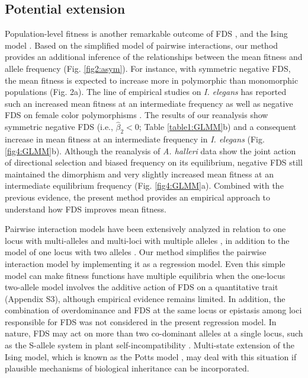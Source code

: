 \documentclass[12pt,]{article}
\begin{document}
\subsection{Potential extension}
Population-level fitness is another remarkable outcome of FDS \citep{cockerham1972frequency,asmussen_frequency-dependent_1990,schneider_maximization_2008,takahashi2018balanced}, and the Ising model \citep{cipra1987introduction,sato2019neighbor}. Based on the simplified model of pairwise interactions, our method provides an additional inference of the relationships between the mean fitness and allele frequency (Fig. \ref{fig2:asym}). For instance, with symmetric negative FDS, the mean fitness is expected to increase more in polymorphic than monomorphic populations (Fig. 2a). The line of empirical studies on \textit{I. elegans} has reported such an increased mean fitness at an intermediate frequency \citep{takahashi2014evolution} as well as negative FDS on female color polymorphisms \citep{le2015evolutionary}. The results of our reanalysis show symmetric negative FDS (i.e., $\hat{\beta}_2<0$; Table \ref{table1:GLMM}b) and a consequent increase in mean fitness at an intermediate frequency in \textit{I. elegans} (Fig. \ref{fig4:GLMM}b). Although the reanalysis of \textit{A. halleri} data show the joint action of directional selection and biased frequency on its equilibrium, negative FDS still maintained the dimorphism and very slightly increased mean fitness at an intermediate equilibrium frequency (Fig. \ref{fig4:GLMM}a). Combined with the previous evidence, the present method provides an empirical approach to understand how FDS improves mean fitness.

Pairwise interaction models have been extensively analyzed in relation to one locus with multi-alleles \citep{schneider2006multilocus} and multi-loci with multiple alleles \citep{schneider2010maximization}, in addition to the model of one locus with two alleles \citep{schneider_maximization_2008}. Our method simplifies the pairwise interaction model by implementing it as a regression model. Even this simple model can make fitness functions have multiple equilibria when the one-locus two-allele model involves the additive action of FDS on a quantitative trait (Appendix S3), although empirical evidence remains limited. In addition, the combination of overdominance and FDS at the same locus or epistasis among loci responsible for FDS was not considered in the present regression model. In nature, FDS may act on more than two co-dominant alleles at a single locus, such as the S-allele system in plant self-incompatibility \citep{bernatzky1994self, hatakeyama1998dominance}. Multi-state extension of the Ising model, which is known as the Potts model \citep{potts_1952}, may deal with this situation if plausible mechanisms of biological inheritance can be incorporated. 
\end{document}
